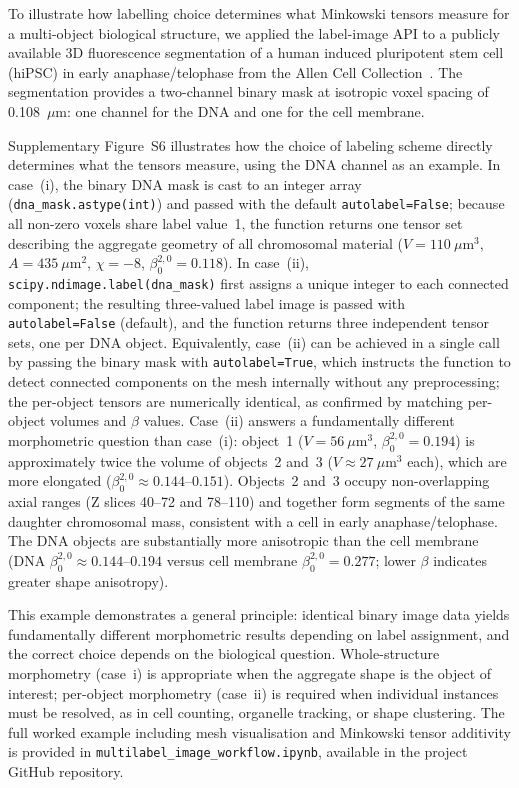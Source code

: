 \documentclass[unnumsec,webpdf,contemporary,large,namedate]{oup-authoring-template}
\begin{document}
To illustrate how labelling choice determines what Minkowski tensors measure for a multi-object biological structure, we applied the label-image API to a publicly available 3D fluorescence segmentation of a human induced pluripotent stem cell (hiPSC) in early anaphase/telophase from the Allen Cell Collection~\citep{viana2023integrated}.
The segmentation provides a two-channel binary mask at isotropic voxel spacing of 0.108~$\mu$m: one channel for the DNA and one for the cell membrane.

Supplementary Figure~S6 illustrates how the choice of labeling scheme directly determines what the tensors measure, using the DNA channel as an example.
In case~(i), the binary DNA mask is cast to an integer array (\texttt{dna\_mask.astype(int)}) and passed with the default \texttt{autolabel=False}; because all non-zero voxels share label value~1, the function returns one tensor set describing the aggregate geometry of all chromosomal material ($V = 110~\mu\text{m}^3$, $A = 435~\mu\text{m}^2$, $\chi = -8$, $\beta_0^{2,0} = 0.118$).
In case~(ii), \texttt{scipy.ndimage.label(dna\_mask)} first assigns a unique integer to each connected component; the resulting three-valued label image is passed with \texttt{autolabel=False} (default), and the function returns three independent tensor sets, one per DNA object.
Equivalently, case~(ii) can be achieved in a single call by passing the binary mask with \texttt{autolabel=True}, which instructs the function to detect connected components on the mesh internally without any preprocessing; the per-object tensors are numerically identical, as confirmed by matching per-object volumes and $\beta$ values.
Case~(ii) answers a fundamentally different morphometric question than case~(i): object~1 ($V = 56~\mu\text{m}^3$, $\beta_0^{2,0} = 0.194$) is approximately twice the volume of objects~2 and~3 ($V \approx 27~\mu\text{m}^3$ each), which are more elongated ($\beta_0^{2,0} \approx 0.144$--$0.151$).
Objects~2 and~3 occupy non-overlapping axial ranges (Z slices 40--72 and 78--110) and together form segments of the same daughter chromosomal mass, consistent with a cell in early anaphase/telophase.
The DNA objects are substantially more anisotropic than the cell membrane (DNA $\beta_0^{2,0} \approx 0.144$--$0.194$ versus cell membrane $\beta_0^{2,0} = 0.277$; lower $\beta$ indicates greater shape anisotropy).

This example demonstrates a general principle: identical binary image data yields fundamentally different morphometric results depending on label assignment, and the correct choice depends on the biological question.
Whole-structure morphometry (case~i) is appropriate when the aggregate shape is the object of interest; per-object morphometry (case~ii) is required when individual instances must be resolved, as in cell counting, organelle tracking, or shape clustering.
The full worked example including mesh visualisation and Minkowski tensor additivity is provided in \texttt{multilabel\_image\_workflow.ipynb}, available in the project GitHub repository.
\end{document}
